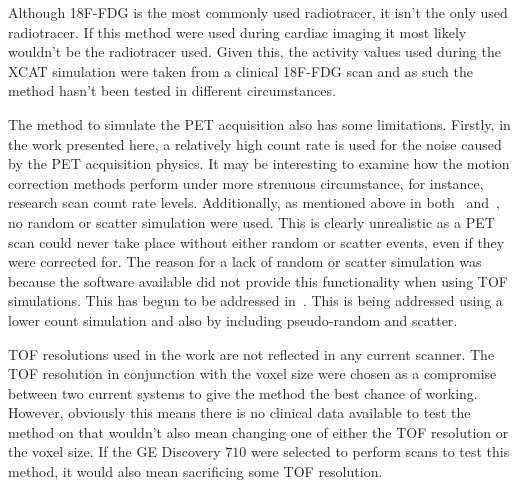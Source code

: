         Although \gls{18F-FDG} is the most commonly used radiotracer, it isn't the only used radiotracer. If this method were used during cardiac imaging it most likely wouldn't be the radiotracer used. Given this, the activity values used during the \gls{XCAT} simulation were taken from a clinical \gls{18F-FDG} scan and as such the method hasn't been tested in different circumstances.
        
        The method to simulate the \gls{PET} acquisition also has some limitations. Firstly, in the work presented here, a relatively high count rate is used for the noise caused by the \gls{PET} acquisition physics. It may be interesting to examine how the motion correction methods perform under more strenuous circumstance, for instance, research scan count rate levels. Additionally, as mentioned above in both~ and~, no random or scatter simulation were used. This is clearly unrealistic as a \gls{PET} scan could never take place without either random or scatter events, even if they were corrected for. The reason for a lack of random or scatter simulation was because the software available did not provide this functionality when using \gls{TOF} simulations. This has begun to be addressed in~. This is being addressed using a lower count simulation and also by including pseudo-random and scatter.
        
        \gls{TOF} resolutions used in the work are not reflected in any current scanner. The \gls{TOF} resolution in conjunction with the voxel size were chosen as a compromise between two current systems to give the method the best chance of working. However, obviously this means there is no clinical data available to test the method on that wouldn't also mean changing one of either the \gls{TOF} resolution or the voxel size. If the \gls{GE} Discovery $710$ were selected to perform scans to test this method, it would also mean sacrificing some \gls{TOF} resolution.
        
